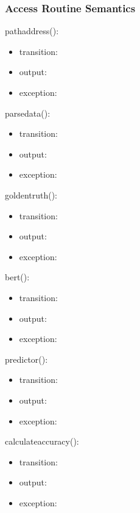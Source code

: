 \documentclass[12pt, titlepage]{article}
\begin{document}
\subsubsection{Access Routine Semantics}

\noindent pathaddress():
\begin{itemize}
\item transition:  
\item output:  
\item exception:  
\end{itemize}

\noindent parsedata():
\begin{itemize}
\item transition:  
\item output:  
\item exception:  
\end{itemize}

\noindent goldentruth():
\begin{itemize}
\item transition:  
\item output:  
\item exception:  
\end{itemize}

\noindent bert():
\begin{itemize}
\item transition:  
\item output:  
\item exception:  
\end{itemize}

\noindent predictor():
\begin{itemize}
\item transition:  
\item output:  
\item exception:  
\end{itemize}

\noindent calculateaccuracy():
\begin{itemize}
\item transition:  
\item output:  
\item exception:  
\end{itemize}
\end{document}
